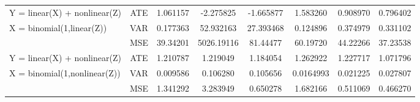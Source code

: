 \documentclass{elegantpaper}
\begin{document}
\begin{table}[H]
\begin{tabular}{llllllll}
    \midrule                
    Y = linear(X) + nonlinear(Z) & \multicolumn{1}{c}{ATE} & \multicolumn{1}{c}{1.061157} & \multicolumn{1}{c}{-2.275825} & \multicolumn{1}{c}{-1.665877} & \multicolumn{1}{c}{ 1.583260}& \multicolumn{1}{c}{0.908970} & \multicolumn{1}{c}{0.796402}\\
    X = binomial(1,linear(Z)) & \multicolumn{1}{c}{VAR} & \multicolumn{1}{c}{0.177363} & \multicolumn{1}{c}{52.932163} & \multicolumn{1}{c}{27.393468} & \multicolumn{1}{c}{0.124896}& \multicolumn{1}{c}{0.374979} & \multicolumn{1}{c}{0.331102}\\
                     & \multicolumn{1}{c}{MSE} & \multicolumn{1}{c}{39.34201} & \multicolumn{1}{c}{5026.19116} & \multicolumn{1}{c}{81.44477} & \multicolumn{1}{c}{60.19720}& \multicolumn{1}{c}{44.22266} & \multicolumn{1}{c}{37.23538}\\%
    \midrule
    Y = linear(X) + nonlinear(Z) & \multicolumn{1}{c}{ATE} & \multicolumn{1}{c}{1.210787} & \multicolumn{1}{c}{1.219049} & \multicolumn{1}{c}{1.184054} & \multicolumn{1}{c}{1.262922}& \multicolumn{1}{c}{1.227717} & \multicolumn{1}{c}{1.071796}\\
    X = binomial(1,nonlinear(Z)) & \multicolumn{1}{c}{VAR} & \multicolumn{1}{c}{0.009586} & \multicolumn{1}{c}{0.106280} & \multicolumn{1}{c}{0.105656} & \multicolumn{1}{c}{0.0164993}& \multicolumn{1}{c}{0.021225} & \multicolumn{1}{c}{0.027807}\\
                     & \multicolumn{1}{c}{MSE} & \multicolumn{1}{c}{1.341292} & \multicolumn{1}{c}{3.283949} & \multicolumn{1}{c}{0.650278} & \multicolumn{1}{c}{1.682166}& \multicolumn{1}{c}{0.511069} & \multicolumn{1}{c}{0.466270}\\%
    \midrule
    \end{tabular}%
  \label{tab:reg}%
\end{table}%
\end{document}
